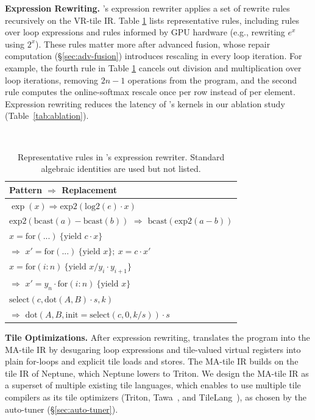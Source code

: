 \textbf{Expression Rewriting.}
\NAME{}'s expression rewriter applies a set of rewrite rules recursively on the VR-tile IR.
Table \ref{tab:rewrite-rules} lists representative rules, including rules over loop expressions
and rules informed by GPU hardware (e.g., rewriting $e^x$ using $2^x$).
These rules matter more after advanced fusion,
whose repair computation (\S\ref{sec:adv-fusion}) introduces rescaling in every loop iteration.
For example, the fourth rule in Table \ref{tab:rewrite-rules}
cancels out division and multiplication over loop iterations, removing $2n - 1$
operations from the program,
and the second rule computes the online-softmax rescale once per row instead of per element.
Expression rewriting reduces the latency of \NAME{}'s kernels in our ablation study
(Table~\ref{tab:ablation}).

\begin{table}[ht]
  \centering
  \scriptsize
  \setlength{\tabcolsep}{3pt}
  \renewcommand{\arraystretch}{1.1}
  \caption{Representative rules in \NAME{}'s expression rewriter. Standard algebraic
  identities are used but not listed.}
  \tt
  \label{tab:rewrite-rules}
  \begin{tabular}{l}
    \hline
    \textbf{Pattern} $\Rightarrow$ \textbf{Replacement} \\
    \hline
    $ \exp(x) \Rightarrow \mathrm{exp2}(\mathrm{log2}(e) \cdot x) $ \\[2pt]
    $\mathrm{exp2}(\text{bcast}(a) - \text{bcast}(b))$ $\Rightarrow$
    $\text{bcast}(\mathrm{exp2}(a - b))$ \\[2pt]
    $ x = \text{for}(...)\ \{ \text{yield } c \cdot x \} $ \\
    \quad $\Rightarrow$ $ x' = \text{for}(...)\ \{ \text{yield } x \};\ x = c \cdot x' $ \\[2pt]
    $ x = \text{for}(i: n)\ \{ \text{yield } x / y_i \cdot y_{i+1} \} $ \\
    \quad $\Rightarrow$ $ x' = y_n \cdot \text{for}(i: n)\ \{ \text{yield } x \} $ \\[2pt]
    $\text{select}(c, \text{dot}(A,B) \cdot s, k)$ \\
    \quad $\Rightarrow$ $\text{dot}(A, B, \text{init} = \text{select}(c, 0, k/s))\cdot s$ \\
    \hline
  \end{tabular}
\end{table}

\textbf{Tile Optimizations.}
After expression rewriting, \NAME{} translates the program into the MA-tile IR
by desugaring loop expressions and tile-valued virtual registers
into plain for-loops and explicit tile loads and stores.
The MA-tile IR builds on the tile IR of Neptune, which Neptune lowers to Triton.
We design the MA-tile IR as a superset of multiple existing tile languages,
which enables \NAME{} to use multiple tile compilers as its tile optimizers
(Triton, Tawa~\cite{tawa}, and TileLang~\cite{tilelang}), as chosen by the auto-tuner
(\S\ref{sec:auto-tuner}).
